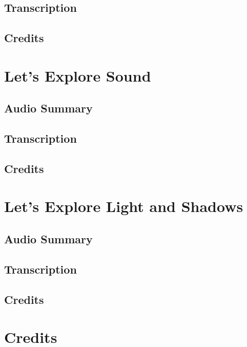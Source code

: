 \subsection{Transcription}

\subsection{Credits}

\section{Let's Explore Sound}

\subsection{Audio Summary}

\subsection{Transcription}

\subsection{Credits}

\section{Let's Explore Light and Shadows}

\subsection{Audio Summary}

\subsection{Transcription}

\subsection{Credits}

\section{Credits}
